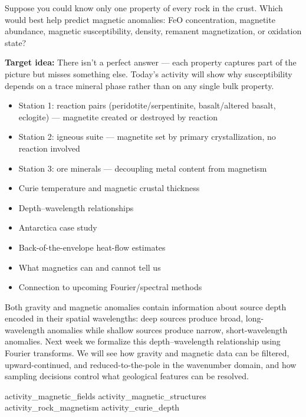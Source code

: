 

Suppose you could know only one property of every rock in the crust. Which would best help predict magnetic anomalies: FeO concentration, magnetite abundance, magnetic susceptibility, density, remanent magnetization, or oxidation state?

\textbf{Target idea:} There isn't a perfect answer --- each property captures part of the picture but misses something else. Today's activity will show why susceptibility depends on a trace mineral phase rather than on any single bulk property.

\begin{itemize}
  \item Station 1: reaction pairs (peridotite/serpentinite, basalt/altered basalt, eclogite) --- magnetite created or destroyed by reaction
  \item Station 2: igneous suite --- magnetite set by primary crystallization, no reaction involved
  \item Station 3: ore minerals --- decoupling metal content from magnetism
\end{itemize}

\begin{itemize}
  \item Curie temperature and magnetic crustal thickness
  \item Depth--wavelength relationships
  \item Antarctica case study
  \item Back-of-the-envelope heat-flow estimates
\end{itemize}

\begin{itemize}
  \item What magnetics can and cannot tell us
  \item Connection to upcoming Fourier/spectral methods
\end{itemize}


Both gravity and magnetic anomalies contain information about source depth encoded in their spatial wavelengths: deep sources produce broad, long-wavelength anomalies while shallow sources produce narrow, short-wavelength anomalies. Next week we formalize this depth--wavelength relationship using Fourier transforms. We will see how gravity and magnetic data can be filtered, upward-continued, and reduced-to-the-pole in the wavenumber domain, and how sampling decisions control what geological features can be resolved.

\workshopend
\notepage
\notepage

{activity_magnetic_fields}
{activity_magnetic_structures}
{activity_rock_magnetism}
{activity_curie_depth}